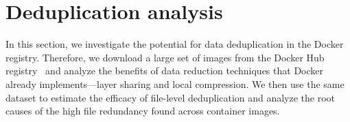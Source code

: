 \section{Deduplication analysis}
\label{sec:redundant_files}

In this section, we investigate the potential for data deduplication in the
Docker registry.
%
Therefore, we download a large set of images from the Docker Hub
registry~\cite{docker-hub} and analyze the benefits of data reduction
techniques that Docker already implements---layer sharing and local
compression.
%
%
%
%
%
%
We then use the same dataset to estimate the efficacy of file-level
deduplication and analyze the root causes of the high file redundancy found
across container images.
%




